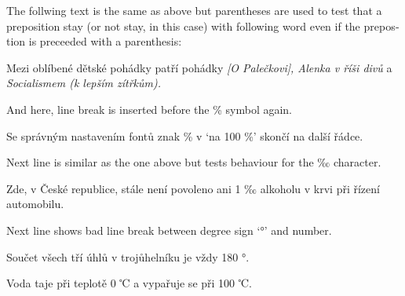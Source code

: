 \documentclass{article}
\newcommand{\expl}[1]{\begin{english}\sffamily #1\end{english}}
\begin{document}
\expl{The follwing text is the same as above but parentheses are used to test
  that a preposition stay (or not stay, in this case) with following word
  even if the prepostion is preceeded with a parenthesis:}

Mezi oblíbené dětské pohádky patří pohádky \emph{[O Palečkovi], Alenka v říši
  divů} a \emph{Socialismem (k lepším zítřkům).}

\expl{And here, line break is inserted before the \% symbol again.}

Se správným nastavením fontů znak \% v `na 100 \%' skončí na další řádce.

\expl{Next line is similar as the one above but tests behaviour for the ‰
  character.}

Zde, v České republice, stále není povoleno ani 1 ‰ alkoholu v krvi při
řízení automobilu.

\expl{Next line shows bad line break between degree sign `°' and number.}

Součet všech tří úhlů v trojůhelníku je vždy 180 °.

Voda taje při teplotě 0 ℃ a vypařuje se při 100 ℃.
\end{document}

